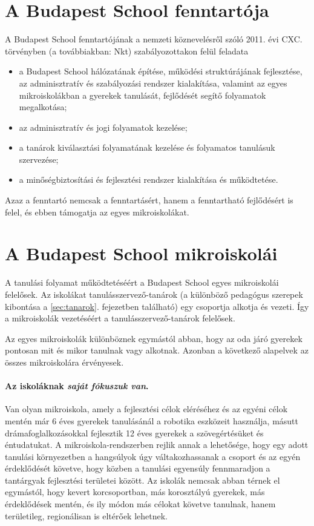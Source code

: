  \section{A Budapest School fenntartója}
  A Budapest School fenntartójának a nemzeti köznevelésről szóló 2011. évi CXC.
  törvényben (a továbbiakban: Nkt)  szabályozottakon felül feladata
  \begin{itemize}
    \item a Budapest School hálózatának építése, működési struktúrájának
          fejlesztése, az adminisztratív és szabályozási rendszer kialakítása,
          valamint az egyes mikroiskolákban a gyerekek tanulását, fejlődését segítő
          folyamatok megalkotása;
    \item  az adminisztratív és jogi folyamatok kezelése;
    \item  a tanárok kiválasztási folyamatának kezelése és folyamatos tanulásuk
          szervezése;
    \item a minőségbiztosítási és fejlesztési rendszer kialakítása és
          működtetése.
  \end{itemize}

  Azaz a fenntartó nemcsak a fenntartásért, hanem a fenntartható fejlődésért is
  felel, és ebben támogatja az egyes mikroiskolákat.

  \section{A Budapest School mikroiskolái}
\fi
A tanulási folyamat működtetéséért a Budapest School egyes mikroiskolái
felelősek. Az iskolákat tanulásszervező-tanárok (a különböző pedagógus
szerepek kibontása a \ref{sec:tanarok}. fejezetben található) egy csoportja
alkotja és vezeti. Így a
mikroiskolák vezetéséért a tanulásszervező-tanárok felelősek.

Az egyes mikroiskolák különböznek egymástól abban, hogy az oda járó gyerekek
pontosan mit és mikor
tanulnak vagy alkotnak. Azonban a következő alapelvek az összes mikroiskolára
érvényesek.

\paragraph{Az iskoláknak \emph{saját fókuszuk van}.}

Van olyan mikroiskola, amely a fejlesztési célok eléréséhez és az egyéni
célok
mentén már 6 éves gyerekek tanulásánál a robotika eszközeit használja,
másutt drámafoglalkozásokkal fejlesztik 12 éves gyerekek a szövegértésüket
és
éntudatukat. A
mikroiskola-rendszerben rejlik annak a lehetősége, hogy egy adott tanulási
környezetben a hangsúlyok úgy váltakozhassanak a csoport és az egyén
érdeklődését követve, hogy közben a tanulási egyensúly fennmaradjon a
tantárgyak fejlesztési területei között. Az iskolák nemcsak abban térnek el
egymástól, hogy kevert korcsoportban, más korosztályú gyerekek, más
érdeklődések mentén, és ily módon más célokat követve tanulnak, hanem
területileg, regionálisan is eltérőek lehetnek.


